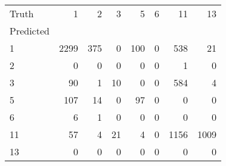 \begin{tabular}{lrrrrrrr}
\toprule
Truth & 1 & 2 & 3 & 5 & 6 & 11 & 13 \\
Predicted &  &  &  &  &  &  &  \\
\midrule
1 & 2299 & 375 & 0 & 100 & 0 & 538 & 21 \\
2 & 0 & 0 & 0 & 0 & 0 & 1 & 0 \\
3 & 90 & 1 & 10 & 0 & 0 & 584 & 4 \\
5 & 107 & 14 & 0 & 97 & 0 & 0 & 0 \\
6 & 6 & 1 & 0 & 0 & 0 & 0 & 0 \\
11 & 57 & 4 & 21 & 4 & 0 & 1156 & 1009 \\
13 & 0 & 0 & 0 & 0 & 0 & 0 & 0 \\
\bottomrule
\end{tabular}
